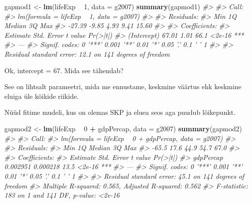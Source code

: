 \documentclass[]{book}
\newenvironment{Shaded}{\begin{snugshade}}{\end{snugshade}}
\newcommand{\CommentTok}[1]{\textcolor[rgb]{0.56,0.35,0.01}{\textit{#1}}}
\newcommand{\DataTypeTok}[1]{\textcolor[rgb]{0.13,0.29,0.53}{#1}}
\newcommand{\DecValTok}[1]{\textcolor[rgb]{0.00,0.00,0.81}{#1}}
\newcommand{\KeywordTok}[1]{\textcolor[rgb]{0.13,0.29,0.53}{\textbf{#1}}}
\newcommand{\NormalTok}[1]{#1}
\newcommand{\OperatorTok}[1]{\textcolor[rgb]{0.81,0.36,0.00}{\textbf{#1}}}
\newcommand{\StringTok}[1]{\textcolor[rgb]{0.31,0.60,0.02}{#1}}
\begin{document}
\begin{Shaded}
\begin{Highlighting}[]
\NormalTok{gapmod1 <-}\StringTok{ }\KeywordTok{lm}\NormalTok{(lifeExp }\OperatorTok{~}\StringTok{ }\DecValTok{1}\NormalTok{, }\DataTypeTok{data =}\NormalTok{ g2007)}
\KeywordTok{summary}\NormalTok{(gapmod1)}
\CommentTok{#> }
\CommentTok{#> Call:}
\CommentTok{#> lm(formula = lifeExp ~ 1, data = g2007)}
\CommentTok{#> }
\CommentTok{#> Residuals:}
\CommentTok{#>    Min     1Q Median     3Q    Max }
\CommentTok{#> -27.39  -9.85   4.93   9.41  15.60 }
\CommentTok{#> }
\CommentTok{#> Coefficients:}
\CommentTok{#>             Estimate Std. Error t value Pr(>|t|)    }
\CommentTok{#> (Intercept)    67.01       1.01    66.1   <2e-16 ***}
\CommentTok{#> ---}
\CommentTok{#> Signif. codes:  0 '***' 0.001 '**' 0.01 '*' 0.05 '.' 0.1 ' ' 1}
\CommentTok{#> }
\CommentTok{#> Residual standard error: 12.1 on 141 degrees of freedom}
\end{Highlighting}
\end{Shaded}

Ok, intercept = 67.
Mida see tähendab?

\begin{Shaded}
\end{Shaded}

See on lihtsalt parameetri, mida me ennustame, keskmine väärtus ehk keskmine eluiga üle kõikide riikide.

Nüüd fitime mudeli, kus on olemas SKP ja eluea seos aga puudub lõikepunkt.

\begin{Shaded}
\begin{Highlighting}[]
\NormalTok{gapmod2 <-}\StringTok{ }\KeywordTok{lm}\NormalTok{(lifeExp }\OperatorTok{~}\StringTok{ }\DecValTok{0} \OperatorTok{+}\StringTok{ }\NormalTok{gdpPercap, }\DataTypeTok{data =}\NormalTok{ g2007)}
\KeywordTok{summary}\NormalTok{(gapmod2)}
\CommentTok{#> }
\CommentTok{#> Call:}
\CommentTok{#> lm(formula = lifeExp ~ 0 + gdpPercap, data = g2007)}
\CommentTok{#> }
\CommentTok{#> Residuals:}
\CommentTok{#>    Min     1Q Median     3Q    Max }
\CommentTok{#>  -65.5   17.6   44.9   54.7   67.0 }
\CommentTok{#> }
\CommentTok{#> Coefficients:}
\CommentTok{#>           Estimate Std. Error t value Pr(>|t|)    }
\CommentTok{#> gdpPercap 0.002951   0.000218    13.5   <2e-16 ***}
\CommentTok{#> ---}
\CommentTok{#> Signif. codes:  0 '***' 0.001 '**' 0.01 '*' 0.05 '.' 0.1 ' ' 1}
\CommentTok{#> }
\CommentTok{#> Residual standard error: 45.1 on 141 degrees of freedom}
\CommentTok{#> Multiple R-squared:  0.565,  Adjusted R-squared:  0.562 }
\CommentTok{#> F-statistic:  183 on 1 and 141 DF,  p-value: <2e-16}
\end{Highlighting}
\end{Shaded}
\end{document}
